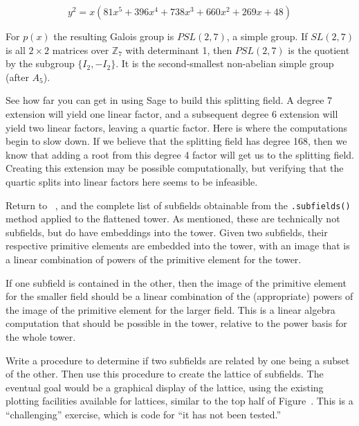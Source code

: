 $$y^2 = x(81x^5 + 396x^4 + 738x^3 + 660x^2 + 269x + 48)$$\par
%
For $p(x)$ the resulting Galois group is $PSL(2,7)$, a simple group.  If $SL(2,7)$ is all $2\times 2$ matrices over ${\mathbb Z}_7$ with determinant 1, then $PSL(2,7)$ is the quotient by the subgroup $\{I_2,-I_2\}$.  It is the second-smallest non-abelian simple group (after $A_5$).\par
%
See how far you can get in using Sage to build this splitting field.  A degree 7 extension will yield one linear factor, and a subsequent degree 6 extension will yield two linear factors, leaving a quartic factor.  Here is where the computations begin to slow down.  If we believe that the splitting field has degree 168, then we know that adding a root from this degree 4 factor will get us to the splitting field.  Creating this extension may be possible computationally, but verifying that the quartic splits into linear factors here seems to be infeasible.
\begin{sageverbatim}\end{sageverbatim}
%
%
Return to ~, and the complete list of subfields obtainable from the \verb?.subfields()? method applied to the flattened tower.  As mentioned, these are technically not subfields, but do have embeddings into the tower.  Given two subfields, their respective primitive elements are embedded into the tower, with an image that is a linear combination of powers of the primitive element for the tower.\par
%
If one subfield is contained in the other, then the image of the primitive element for the smaller field should be a linear combination of the (appropriate) powers of the image of the primitive element for the larger field.  This is a linear algebra computation that should be possible in the tower, relative to the power basis for the whole tower.\par
%
Write a procedure to determine if two subfields are related by one being a subset of the other.  Then use this procedure to create the lattice of subfields.  The eventual goal would be a graphical display of the lattice, using the existing plotting facilities available for lattices, similar to the top half of Figure~.  This is a ``challenging'' exercise, which is code for ``it has not been tested.''
\begin{sageverbatim}\end{sageverbatim}
%

